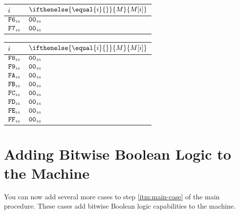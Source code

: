 \documentclass[a4paper,12pt]{article}
\makeatletter
\newcommand{\num}[1]{\texttt{#1}}
\newcommand{\hex}[1]{\num{#1}_{\textup{\tiny 16}}}
\newcommand{\MEM}[1]{\ifthenelse{\equal{#1}{}}{M}{M[#1]}}
\newenvironment{memtable}{%
  \begin{trivlist}
    \item
    }{%
    \end{trivlist}}
\newenvironment{memcolumn}{%
  \begin{tabular}{@{}ll@{}}
    $i$ & $\MEM{i}$ \\
    \hline}
    {%
  \end{tabular}}
\newcommand{\memspace}{\qquad}
\makeatother
\begin{document}
\begin{memtable}
\begin{memcolumn}
    $\hex{F6}$ & $\hex{00}$ \\
    $\hex{F7}$ & $\hex{00}$ \\
  \end{memcolumn}
  \memspace
  \begin{memcolumn}
    $\hex{F8}$ & $\hex{00}$ \\
    $\hex{F9}$ & $\hex{00}$ \\
    $\hex{FA}$ & $\hex{00}$ \\
    $\hex{FB}$ & $\hex{00}$ \\
    $\hex{FC}$ & $\hex{00}$ \\
    $\hex{FD}$ & $\hex{00}$ \\
    $\hex{FE}$ & $\hex{00}$ \\
    $\hex{FF}$ & $\hex{00}$ \\
  \end{memcolumn}
\end{memtable}


\section{Adding Bitwise Boolean Logic to the Machine}

You can now add several more cases to step \ref{itm:main-case} of the main procedure.
These cases add bitwise Boolean logic capabilities to the machine.
\end{document}
